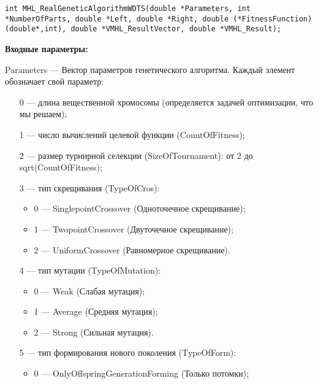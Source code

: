 \documentclass[a4paper,12pt]{article}
\begin{document}
\begin{lstlisting}[label=code_syntax_MHL_RealGeneticAlgorithmWDTS,caption=Синтаксис]
int MHL_RealGeneticAlgorithmWDTS(double *Parameters, int *NumberOfParts, double *Left, double *Right, double (*FitnessFunction)(double*,int), double *VMHL_ResultVector, double *VMHL_Result);
\end{lstlisting}

\textbf{Входные параметры:}
 
Parameters --- Вектор параметров генетического алгоритма. Каждый элемент обозначает свой параметр:
 
 \begin{itemize}
 \item   [0] --- длина вещественной хромосомы (определяется задачей оптимизации, что мы решаем);
  \item   [1] --- число вычислений целевой функции (CountOfFitness);
   \item [2] --- размер турнирной селекции (SizeOfTournament): от 2 до sqrt(CountOfFitness);
 
 \item [3] --- тип скрещивания (TypeOfCros):
  \begin{itemize}
       \item 0 --- SinglepointCrossover (Одноточечное скрещивание);
 
       \item 1 --- TwopointCrossover (Двуточечное скрещивание);
 
       \item 2 --- UniformCrossover (Равномерное скрещивание).
	    \end{itemize}
 
 \item [4] --- тип мутации (TypeOfMutation):
  \begin{itemize}
       \item 0 --- Weak (Слабая мутация);
 
       \item 1 --- Average (Средняя мутация);
 
       \item 2 --- Strong (Сильная мутация).
	    \end{itemize}
 
 \item [5] --- тип формирования нового поколения (TypeOfForm):
  \begin{itemize}
       \item 0 --- OnlyOffspringGenerationForming (Только потомки);
 

\end{itemize}
\end{itemize}
\end{document}

